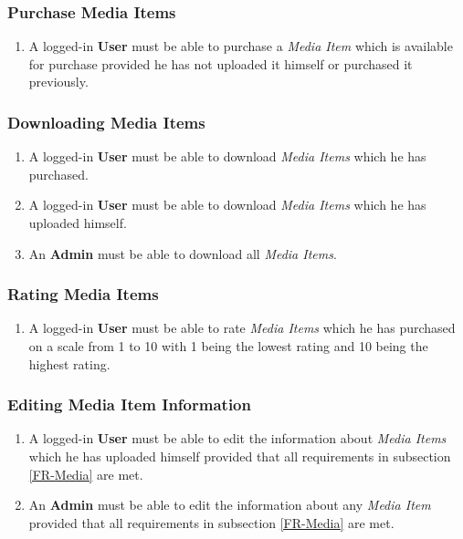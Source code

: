\subsubsection {Purchase Media Items}

\begin{enumerate}[label=\textbf{FR-\twodigits*}, resume]
	\item A logged-in \textbf{User} must be able to purchase a \textit{Media Item} which is available for purchase provided he has not uploaded it himself or  purchased it previously.
\end{enumerate}

\subsubsection {Downloading Media Items}

\begin{enumerate}[label=\textbf{FR-\twodigits*}, resume]
	\item A logged-in \textbf{User} must be able to download \textit{Media Items} which he has purchased.
	\item A logged-in \textbf{User} must be able to download \textit{Media Items} which he has uploaded himself.
	\item An \textbf{Admin} must be able to download all \textit{Media Items}.
\end{enumerate}
		
\subsubsection {Rating Media Items} \label{FR-RatingMedia}

\begin{enumerate}[label=\textbf{FR-\twodigits*}, resume]
	\item A logged-in \textbf{User} must be able to rate \textit{Media Items} which he has purchased on a scale from 1 to 10 with 1 being the lowest rating and 10 being the highest rating.
\end{enumerate}

\subsubsection{Editing Media Item Information}

\begin{enumerate}[label=\textbf{FR-\twodigits*}, resume]
	\item A logged-in \textbf{User} must be able to edit the information about \textit{Media Items} which he has uploaded himself provided that all requirements in subsection \ref{FR-Media} are met.
	\item An \textbf{Admin} must be able to edit the information about any \textit{Media Item} provided that all requirements in subsection \ref{FR-Media} are met.
\end{enumerate}
			
